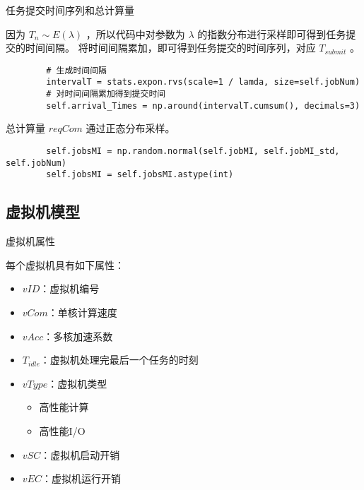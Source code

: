 \begin{frame}[fragile]{任务提交时间序列和总计算量}

    因为 $T_n \sim E(\lambda)$ ，所以代码中对参数为 $\lambda$ 的指数分布进行采样即可得到任务提交的时间间隔。
    将时间间隔累加，即可得到任务提交的时间序列，对应 $T_{submit}$ 。

    \scriptsize
    \begin{verbatim}
        # 生成时间间隔
        intervalT = stats.expon.rvs(scale=1 / lamda, size=self.jobNum)
        # 对时间间隔累加得到提交时间
        self.arrival_Times = np.around(intervalT.cumsum(), decimals=3)
    \end{verbatim}

    \normalsize
    总计算量 $reqCom$ 通过正态分布采样。

    \scriptsize
    \begin{verbatim}
        self.jobsMI = np.random.normal(self.jobMI, self.jobMI_std, self.jobNum)
        self.jobsMI = self.jobsMI.astype(int)
    \end{verbatim}
\end{frame}

\subsection{虚拟机模型}

\begin{frame}{虚拟机属性}

    每个虚拟机具有如下属性：

    \begin{itemize}
        \item $vID$：虚拟机编号
        \item $vCom$：单核计算速度
        \item $vAcc$：多核加速系数
        \item $T_{idle}$：虚拟机处理完最后一个任务的时刻
        \item $vType$：虚拟机类型
              \begin{itemize}
                  \item 高性能计算
                  \item 高性能I/O
              \end{itemize}
        \item $vSC$：虚拟机启动开销
        \item $vEC$：虚拟机运行开销
    \end{itemize}
\end{frame}

